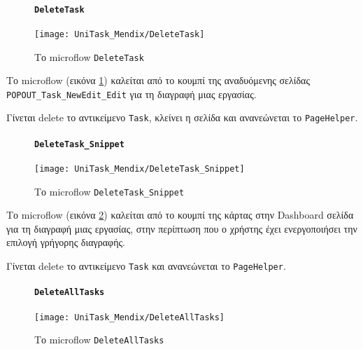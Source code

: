                 \begin{figure}[H] \noindent
                    \paragraph{\texttt{DeleteTask}}
                    \begin{center}
                        \texttt{[image: UniTask\_Mendix/DeleteTask]}
                        \caption{\centering Το microflow \texttt{DeleteTask}}
                        \label{fig:unitask_DeleteTask}
                    \end{center}
                \end{figure}

                Το microflow (εικόνα \ref{fig:unitask_DeleteTask}) καλείται από το κουμπί της αναδυόμενης σελίδας \texttt{POPOUT\_Task\_NewEdit\_Edit} για τη διαγραφή μιας εργασίας.

                Γίνεται delete το αντικείμενο \texttt{Task}, κλείνει η σελίδα και ανανεώνεται το \texttt{PageHelper}.

                \begin{figure}[H] \noindent
                    \paragraph{\texttt{DeleteTask\_Snippet}}
                    \begin{center}
                        \texttt{[image: UniTask\_Mendix/DeleteTask\_Snippet]}
                        \caption{\centering Το microflow \texttt{DeleteTask\_Snippet}}
                        \label{fig:unitask_DeleteTask_Snippet}
                    \end{center}
                \end{figure}

                Το microflow (εικόνα \ref{fig:unitask_DeleteTask_Snippet}) καλείται από το κουμπί της κάρτας στην Dashboard σελίδα για τη διαγραφή μιας εργασίας, στην περίπτωση που ο χρήστης έχει ενεργοποιήσει την επιλογή γρήγορης διαγραφής.

                Γίνεται delete το αντικείμενο \texttt{Task} και ανανεώνεται το \texttt{PageHelper}.

                \begin{figure}[H] \noindent
                    \paragraph{\texttt{DeleteAllTasks}}
                    \begin{center}
                        \texttt{[image: UniTask\_Mendix/DeleteAllTasks]}
                        \caption{\centering Το microflow \texttt{DeleteAllTasks}}
                        \label{fig:unitask_DeleteAllTasks}
                    \end{center}
                \end{figure}

